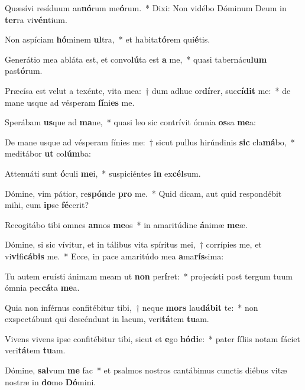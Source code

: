 \item Quæsívi resíduum an\textbf{nó}rum me\textbf{ó}rum.~* Dixi: Non vidébo Dóminum Deum in \textbf{ter}ra vi\textbf{vén}tium.
\item Non aspíciam \textbf{hó}minem \textbf{ul}tra,~* et habita\textbf{tó}rem qui\textbf{é}tis.
\item Generátio mea abláta est, et convo\textbf{lú}ta est \textbf{a} me,~* quasi tabernácu\textbf{lum} pas\textbf{tó}rum.
\item Præcísa est velut a texénte, vita mea:~† dum adhuc or\textbf{dí}rer, suc\textbf{cí}\textbf{dit} me:~* de mane usque ad vésperam \textbf{fí}ni\textbf{es} me.
\item Sperábam \textbf{us}que ad \textbf{ma}ne,~* quasi leo sic contrívit ómnia \textbf{os}sa \textbf{me}a:
\item De mane usque ad vésperam fínies me:~† sicut pullus hirúndinis \textbf{sic} cla\textbf{má}bo,~* meditábor \textbf{ut} co\textbf{lúm}ba:
\item Attenuáti sunt \textbf{ó}culi \textbf{me}i,~* suspiciéntes \textbf{in} ex\textbf{cél}sum.
\item Dómine, vim pátior, re\textbf{spón}de \textbf{pro} me.~* Quid dicam, aut quid respondébit mihi, cum \textbf{ip}se \textbf{fé}cerit?
\item Recogitábo tibi omnes \textbf{an}nos \textbf{me}os~* in amaritúdine \textbf{á}nimæ \textbf{me}æ.
\item Dómine, si sic vívitur, et in tálibus vita spíritus mei,~† corrípies me, et vi\textbf{vi}fi\textbf{cá}\textbf{bis} me.~* Ecce, in pace amaritúdo mea \textbf{a}ma\textbf{rís}sima:
\item Tu autem eruísti ánimam meam ut \textbf{non} per\textbf{í}ret:~* projecísti post tergum tuum ómnia pec\textbf{cá}ta \textbf{me}a.
\item Quia non inférnus confitébitur tibi,~† neque \textbf{mors} lau\textbf{dá}\textbf{bit} te:~* non exspectábunt qui descéndunt in lacum, veri\textbf{tá}tem \textbf{tu}am.
\item Vivens vivens ipse confitébitur tibi, sicut et \textbf{e}go \textbf{hó}\textbf{di}e:~* pater fíliis notam fáciet veri\textbf{tá}tem \textbf{tu}am.
\item Dómine, \textbf{sal}vum \textbf{me} fac~* et psalmos nostros cantábimus cunctis diébus vitæ nostræ in \textbf{do}mo \textbf{Dó}mini.
